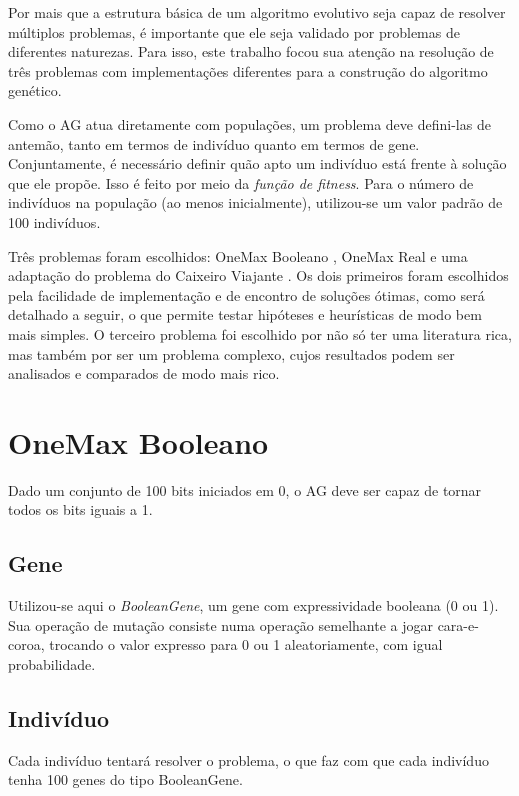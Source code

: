 \label{2_problemas}

Por mais que a estrutura básica de um algoritmo evolutivo seja capaz de resolver múltiplos problemas, é importante que ele seja validado por problemas de diferentes naturezas. Para isso, este trabalho focou sua atenção na resolução de três problemas com implementações diferentes para a construção do algoritmo genético.

Como o AG atua diretamente com populações, um problema deve defini-las de antemão, tanto em termos de indivíduo quanto em termos de gene. Conjuntamente, é necessário definir quão apto um indivíduo está frente à solução que ele propõe. Isso é feito por meio da \emph{função de fitness}. Para o número de indivíduos na população (ao menos inicialmente), utilizou-se um valor padrão de 100 indivíduos.

Três problemas foram escolhidos: OneMax Booleano \cite{giguere1998population}, OneMax Real e uma adaptação do problema do Caixeiro Viajante \cite{applegate2011traveling}. Os dois primeiros foram escolhidos pela facilidade de implementação e de encontro de soluções ótimas, como será detalhado a seguir, o que permite testar hipóteses e heurísticas de modo bem mais simples. O terceiro problema foi escolhido por não só ter uma literatura rica, mas também por ser um problema complexo, cujos resultados podem ser analisados e comparados de modo mais rico.

\section{OneMax Booleano}

Dado um conjunto de 100 bits iniciados em 0, o AG deve ser capaz de tornar todos os bits iguais a 1.

\subsection*{Gene}

Utilizou-se aqui o \emph{BooleanGene}, um gene com expressividade booleana (0 ou 1). Sua operação de mutação consiste numa operação semelhante a jogar cara-e-coroa, trocando o valor expresso para 0 ou 1 aleatoriamente, com igual probabilidade.

\subsection*{Indivíduo}

Cada indivíduo tentará resolver o problema, o que faz com que cada indivíduo tenha 100 genes do tipo BooleanGene.

